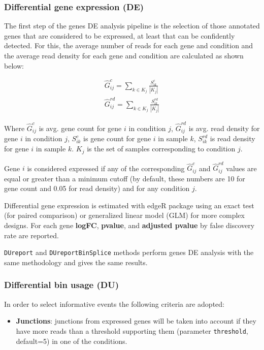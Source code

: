 \documentclass{article}
\begin{document}

\subsubsection{Differential gene expression (DE)}

The first step of the genes DE analysis pipeline is the selection of those
annotated genes that are considered to be expressed, at least that can be
confidently detected. For this, the average number of reads for each gene
and condition and the average read density for each gene and condition are
calculated as shown below:

\begin{eqnarray*}
   \hat G^{c}_{ij} = \sum_{k \in K_j} \frac{ S^{c}_{ik} }{ |K_j| } \\
   \hat G^{rd}_{ij} = \sum_{k \in K_j} \frac{ S^{rd}_{ik} }{ |K_j| }
   \label{eq:genByCond}
\end{eqnarray*}

Where $\hat G^{c}_{ij}$ is avg. gene count for gene $i$ in condition $j$,
$\hat G^{rd}_{ij}$ is avg. read density for gene $i$ in condition $j$, $S^{c}_{ik}$
is gene count for gene $i$ in sample $k$, $S^{rd}_{ik}$ is read density for
gene $i$ in sample $k$. $K_j$ is the set of samples corresponding to condition $j$.

Gene $i$ is considered expressed if any of the corresponding $\hat G^{c}_{ij}$
and $\hat G^{rd}_{ij}$ values are equal or greater than a minimum cutoff (by 
default, these numbers are 10 for gene count and 0.05 for read density) and for
any condition $j$.

Differential gene expression is estimated with edgeR \cite{Robinson2012} 
package using an exact test (for paired comparison) or generalized linear model
(GLM) for more complex designs. For each gene \textbf{logFC}, \textbf{pvalue},
and \textbf{adjusted  pvalue} by false discovery rate \cite{fdr} are reported. 

\texttt{DUreport} and \texttt{DUreportBinSplice} methods perform genes DE
analysis with the same methodology and gives the same results.


\subsubsection{Differential bin usage (DU)}
In order to select informative events the following criteria are adopted:
  
\begin{itemize}
\item \textbf{Junctions}: junctions from expressed genes will be taken into account if they have more reads than a threshold supporting them (parameter \texttt{threshold}, default=5) in one of the conditions. 
\end{itemize}
\end{document}
